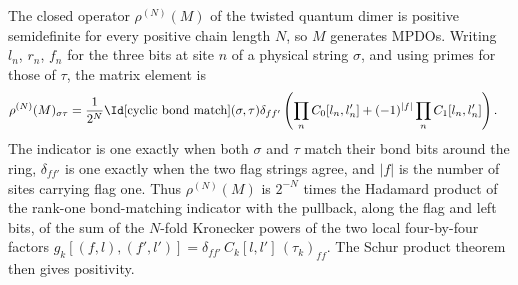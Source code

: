 \begin{lemma}%
    \label{thm:mpdo_twisted_dimer_ismpdo}
    \leanok
    The closed operator $\rho^{(N)}(M)$ of the twisted quantum dimer is
    positive semidefinite for every positive chain length $N$, so $M$
    generates MPDOs. Writing $l_n$, $r_n$, $f_n$ for the three bits at
    site $n$ of a physical string $\sigma$, and using primes for those
    of $\tau$, the matrix element is
    \begin{align}
        \rho^{(N)}(M)_{\sigma\tau}
         & =\frac1{2^N}
        \Id[\text{cyclic bond match}](\sigma,\tau)
        \delta_{f f'}\left(\prod_n C_0[l_n,l'_n]
        +(-1)^{\lvert f\rvert}\prod_n C_1[l_n,l'_n]\right).
        \notag
    \end{align}
    The indicator is one exactly when both $\sigma$ and $\tau$ match
    their bond bits around the ring, $\delta_{ff'}$ is one exactly when the two
    flag strings agree, and $\lvert f\rvert$ is the number of sites carrying
    flag one. Thus $\rho^{(N)}(M)$ is $2^{-N}$ times the Hadamard product
    of the rank-one bond-matching indicator with the pullback, along the
    flag and left bits, of the sum of the $N$-fold Kronecker powers of
    the two local four-by-four factors
    $g_k[(f,l),(f',l')]=\delta_{ff'}\,C_k[l,l']\,(\tau_k)_{ff}$.
    The Schur product theorem then gives positivity.
\end{lemma}

